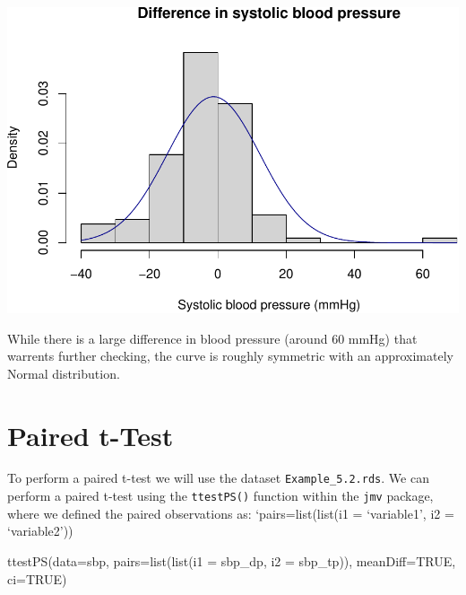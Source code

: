 \documentclass[
]{memoir}
\newenvironment{Shaded}{\begin{snugshade}}{\end{snugshade}}
\newcommand{\AttributeTok}[1]{\textcolor[rgb]{0.77,0.63,0.00}{#1}}
\newcommand{\ConstantTok}[1]{\textcolor[rgb]{0.00,0.00,0.00}{#1}}
\newcommand{\FunctionTok}[1]{\textcolor[rgb]{0.00,0.00,0.00}{#1}}
\newcommand{\NormalTok}[1]{#1}
\newcommand{\StringTok}[1]{\textcolor[rgb]{0.31,0.60,0.02}{#1}}
\begin{document}
\includegraphics{phcm9795-R-notes_files/figure-latex/unnamed-chunk-94-1.pdf}

While there is a large difference in blood pressure (around 60 mmHg) that warrents further checking, the curve is roughly symmetric with an approximately Normal distribution.

\hypertarget{paired-t-test}{%
\section{Paired t-Test}\label{paired-t-test}}

To perform a paired t-test we will use the dataset \texttt{Example\_5.2.rds}. We can perform a paired t-test using the \texttt{ttestPS()} function within the \texttt{jmv} package, where we defined the paired observations as: `pairs=list(list(i1 = `variable1', i2 = `variable2'))

\begin{Shaded}
\begin{Highlighting}[]
\FunctionTok{ttestPS}\NormalTok{(}\AttributeTok{data=}\NormalTok{sbp, }\AttributeTok{pairs=}\FunctionTok{list}\NormalTok{(}\FunctionTok{list}\NormalTok{(}\AttributeTok{i1 =} \StringTok{\textquotesingle{}sbp\_dp\textquotesingle{}}\NormalTok{, }\AttributeTok{i2 =} \StringTok{\textquotesingle{}sbp\_tp\textquotesingle{}}\NormalTok{)), }\AttributeTok{meanDiff=}\ConstantTok{TRUE}\NormalTok{, }\AttributeTok{ci=}\ConstantTok{TRUE}\NormalTok{)}
\end{Highlighting}
\end{Shaded}
\end{document}
